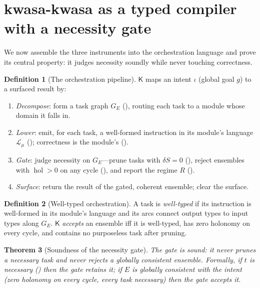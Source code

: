 \documentclass[twocolumn,11pt,a4paper]{article}
\theoremstyle{sup}
\newtheorem{theorem}{Theorem}[section]
\theoremstyle{definition}
\newtheorem{definition}[theorem]{Definition}
\theoremstyle{remark}
\DeclareMathOperator{\hol}{hol}
\newcommand{\Sent}{S}                 %
\newcommand{\task}{t}
\newcommand{\Ens}{E}                  %
\newcommand{\intent}{\iota}           %
\newcommand{\modu}{\mu}               %
\newcommand{\dsl}{\mathcal{L}}        %
\newcommand{\orch}{\mathsf{K}}        %
\newcommand{\contrib}{\delta\Sent}    %
\newcommand{\Rens}{R}                 %
\begin{document}
\section{kwasa-kwasa as a typed compiler with a necessity gate}
\label{sec:language}

We now assemble the three instruments into the orchestration language and prove
its central property: it judges necessity soundly while never touching
correctness.

\begin{definition}[The orchestration pipeline]
\label{def:pipeline}
$\orch$ maps an intent $\intent$ (global goal $g$) to a surfaced result by:
\begin{enumerate}[label=\textup{(\arabic*)},leftmargin=2em,itemsep=1pt]
\item \emph{Decompose}: form a task graph $G_\Ens$ (),
routing each task to a module whose domain it falls in.
\item \emph{Lower}: emit, for each task, a well-formed instruction in its module's
language $\dsl_\modu$ (); correctness is the module's
().
\item \emph{Gate}: judge necessity on $G_\Ens$---prune tasks with $\contrib=0$
(), reject ensembles with $\hol>0$ on any cycle
(), and report the regime $\Rens$ ().
\item \emph{Surface}: return the result of the gated, coherent ensemble; clear the
surface.
\end{enumerate}
\end{definition}

\begin{definition}[Well-typed orchestration]
\label{def:welltyped}
A task is \emph{well-typed} if its instruction is well-formed in its module's
language and its arcs connect output types to input types along $G_\Ens$. $\orch$
\emph{accepts} an ensemble iff it is well-typed, has zero holonomy on every cycle,
and contains no purposeless task after pruning.
\end{definition}

\begin{theorem}[Soundness of the necessity gate]
\label{thm:gate-sound}
The gate is \emph{sound}: it never prunes a necessary task and never rejects a
globally consistent ensemble. Formally, if $\task$ is necessary
() then the gate retains it; if $\Ens$ is globally consistent
with the intent (zero holonomy on every cycle, every task necessary) then the gate
accepts it.
\end{theorem}
\end{document}
